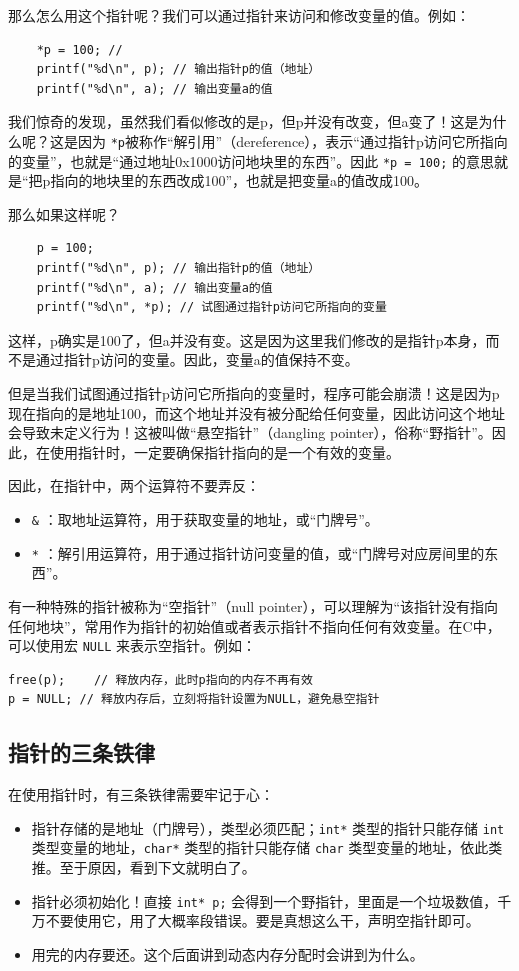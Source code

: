 那么怎么用这个指针呢？我们可以通过指针来访问和修改变量的值。例如：
\begin{verbatim}
    *p = 100; //
    printf("%d\n", p); // 输出指针p的值（地址）
    printf("%d\n", a); // 输出变量a的值
\end{verbatim}
我们惊奇的发现，虽然我们看似修改的是p，但p并没有改变，但a变了！这是为什么呢？这是因为 \texttt{*p}被称作“解引用”（dereference），表示“通过指针p访问它所指向的变量”，也就是“通过地址0x1000访问地块里的东西”。因此 \texttt{*p = 100;} 的意思就是“把p指向的地块里的东西改成100”，也就是把变量a的值改成100。

那么如果这样呢？
\begin{verbatim}
    p = 100;
    printf("%d\n", p); // 输出指针p的值（地址）
    printf("%d\n", a); // 输出变量a的值
    printf("%d\n", *p); // 试图通过指针p访问它所指向的变量
\end{verbatim}
这样，p确实是100了，但a并没有变。这是因为这里我们修改的是指针p本身，而不是通过指针p访问的变量。因此，变量a的值保持不变。

但是当我们试图通过指针p访问它所指向的变量时，程序可能会崩溃！这是因为p现在指向的是地址100，而这个地址并没有被分配给任何变量，因此访问这个地址会导致未定义行为！这被叫做“悬空指针”（dangling pointer），俗称“野指针”。因此，在使用指针时，一定要确保指针指向的是一个有效的变量。

因此，在指针中，两个运算符不要弄反：
\begin{itemize}
  \item \texttt{\&} ：取地址运算符，用于获取变量的地址，或“门牌号”。
  \item \texttt{*} ：解引用运算符，用于通过指针访问变量的值，或“门牌号对应房间里的东西”。
\end{itemize}

有一种特殊的指针被称为“空指针”（null pointer），可以理解为“该指针没有指向任何地块”，常用作为指针的初始值或者表示指针不指向任何有效变量。在C中，可以使用宏 \texttt{NULL} 来表示空指针。例如：
\begin{verbatim}
free(p);    // 释放内存，此时p指向的内存不再有效
p = NULL; // 释放内存后，立刻将指针设置为NULL，避免悬空指针
\end{verbatim}

\subsection{指针的三条铁律}
在使用指针时，有三条铁律需要牢记于心：
\begin{itemize}
  \item 指针存储的是地址（门牌号），类型必须匹配；\texttt{int*} 类型的指针只能存储 \texttt{int} 类型变量的地址，\texttt{char*} 类型的指针只能存储 \texttt{char} 类型变量的地址，依此类推。至于原因，看到下文就明白了。
  \item 指针必须初始化！直接 \texttt{int* p;} 会得到一个野指针，里面是一个垃圾数值，千万不要使用它，用了大概率段错误。要是真想这么干，声明空指针即可。
  \item 用完的内存要还。这个后面讲到动态内存分配时会讲到为什么。
\end{itemize}

